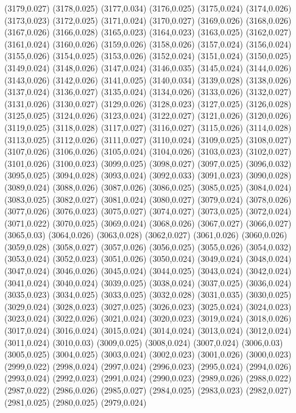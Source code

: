 (3179,0.027)
(3178,0.025)
(3177,0.034)
(3176,0.025)
(3175,0.024)
(3174,0.026)
(3173,0.023)
(3172,0.025)
(3171,0.024)
(3170,0.027)
(3169,0.026)
(3168,0.026)
(3167,0.026)
(3166,0.028)
(3165,0.023)
(3164,0.023)
(3163,0.025)
(3162,0.027)
(3161,0.024)
(3160,0.026)
(3159,0.026)
(3158,0.026)
(3157,0.024)
(3156,0.024)
(3155,0.026)
(3154,0.025)
(3153,0.026)
(3152,0.024)
(3151,0.024)
(3150,0.025)
(3149,0.024)
(3148,0.026)
(3147,0.024)
(3146,0.035)
(3145,0.024)
(3144,0.026)
(3143,0.026)
(3142,0.026)
(3141,0.025)
(3140,0.034)
(3139,0.028)
(3138,0.026)
(3137,0.024)
(3136,0.027)
(3135,0.024)
(3134,0.026)
(3133,0.026)
(3132,0.027)
(3131,0.026)
(3130,0.027)
(3129,0.026)
(3128,0.023)
(3127,0.025)
(3126,0.028)
(3125,0.025)
(3124,0.026)
(3123,0.024)
(3122,0.027)
(3121,0.026)
(3120,0.026)
(3119,0.025)
(3118,0.028)
(3117,0.027)
(3116,0.027)
(3115,0.026)
(3114,0.028)
(3113,0.025)
(3112,0.026)
(3111,0.027)
(3110,0.024)
(3109,0.025)
(3108,0.027)
(3107,0.026)
(3106,0.026)
(3105,0.024)
(3104,0.026)
(3103,0.023)
(3102,0.027)
(3101,0.026)
(3100,0.023)
(3099,0.025)
(3098,0.027)
(3097,0.025)
(3096,0.032)
(3095,0.025)
(3094,0.028)
(3093,0.024)
(3092,0.033)
(3091,0.023)
(3090,0.028)
(3089,0.024)
(3088,0.026)
(3087,0.026)
(3086,0.025)
(3085,0.025)
(3084,0.024)
(3083,0.025)
(3082,0.027)
(3081,0.024)
(3080,0.027)
(3079,0.024)
(3078,0.026)
(3077,0.026)
(3076,0.023)
(3075,0.027)
(3074,0.027)
(3073,0.025)
(3072,0.024)
(3071,0.022)
(3070,0.025)
(3069,0.024)
(3068,0.026)
(3067,0.027)
(3066,0.027)
(3065,0.03)
(3064,0.026)
(3063,0.028)
(3062,0.027)
(3061,0.026)
(3060,0.026)
(3059,0.028)
(3058,0.027)
(3057,0.026)
(3056,0.025)
(3055,0.026)
(3054,0.032)
(3053,0.024)
(3052,0.023)
(3051,0.026)
(3050,0.024)
(3049,0.024)
(3048,0.024)
(3047,0.024)
(3046,0.026)
(3045,0.024)
(3044,0.025)
(3043,0.024)
(3042,0.024)
(3041,0.024)
(3040,0.024)
(3039,0.025)
(3038,0.024)
(3037,0.025)
(3036,0.024)
(3035,0.023)
(3034,0.025)
(3033,0.025)
(3032,0.028)
(3031,0.035)
(3030,0.025)
(3029,0.024)
(3028,0.023)
(3027,0.025)
(3026,0.023)
(3025,0.024)
(3024,0.023)
(3023,0.024)
(3022,0.026)
(3021,0.024)
(3020,0.023)
(3019,0.024)
(3018,0.026)
(3017,0.024)
(3016,0.024)
(3015,0.024)
(3014,0.024)
(3013,0.024)
(3012,0.024)
(3011,0.024)
(3010,0.03)
(3009,0.025)
(3008,0.024)
(3007,0.024)
(3006,0.03)
(3005,0.025)
(3004,0.025)
(3003,0.024)
(3002,0.023)
(3001,0.026)
(3000,0.023)
(2999,0.022)
(2998,0.024)
(2997,0.024)
(2996,0.023)
(2995,0.024)
(2994,0.026)
(2993,0.024)
(2992,0.023)
(2991,0.024)
(2990,0.023)
(2989,0.026)
(2988,0.022)
(2987,0.022)
(2986,0.026)
(2985,0.027)
(2984,0.025)
(2983,0.023)
(2982,0.027)
(2981,0.025)
(2980,0.025)
(2979,0.024)
